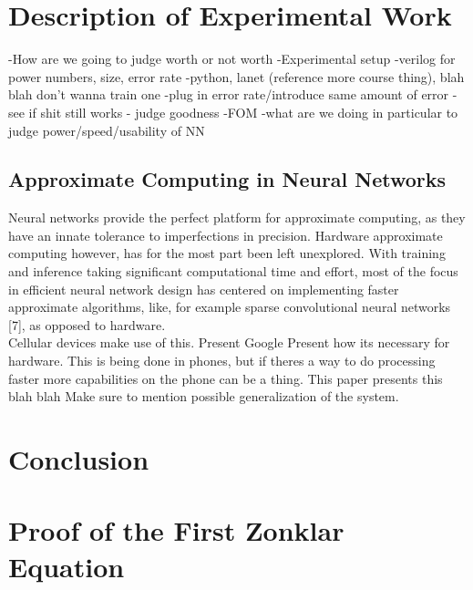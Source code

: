 \documentclass[conference]{IEEEtran}
\begin{document}
\section{Description of Experimental Work}
-How are we going to judge worth or not worth
-Experimental setup
	-verilog for power numbers, size, error rate
-python, lanet (reference more course thing), blah blah don’t wanna train one
	-plug in error rate/introduce same amount of error
-see if shit still works
	- judge goodness
-FOM
	-what are we doing in particular to judge power/speed/usability of NN


\subsection{Approximate Computing in Neural Networks}
	Neural networks provide the perfect platform for approximate computing, as they have an innate tolerance to imperfections in precision. Hardware approximate computing however, has for the most part been left unexplored. With training and inference taking significant computational time and effort, most of the focus in efficient neural network design has centered on implementing faster approximate algorithms, like, for example sparse convolutional neural networks [7], as opposed to hardware.\\
	\indent Cellular devices make use of this. Present Google  
	Present how its necessary for hardware. This is being done in phones, but if theres a way to do processing faster more capabilities on the phone can be a thing.
	This paper presents this blah blah 
	Make sure to mention possible generalization of the system. 
\section{Conclusion}
\blindtext

\appendices
\section{Proof of the First Zonklar Equation}
\blindtext
\end{document}
